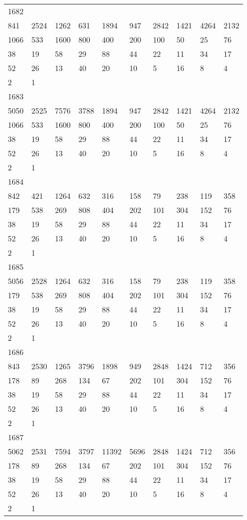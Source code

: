 \begin{longtable}{*{10}{l}}
1682&&&&&&&&&\\
841& 2524& 1262& 631& 1894& 947& 2842& 1421& 4264& 2132\\
1066& 533& 1600& 800& 400& 200& 100& 50& 25& 76\\
38& 19& 58& 29& 88& 44& 22& 11& 34& 17\\
52& 26& 13& 40& 20& 10& 5& 16& 8& 4\\
2& 1& \\

1683&&&&&&&&&\\
5050& 2525& 7576& 3788& 1894& 947& 2842& 1421& 4264& 2132\\
1066& 533& 1600& 800& 400& 200& 100& 50& 25& 76\\
38& 19& 58& 29& 88& 44& 22& 11& 34& 17\\
52& 26& 13& 40& 20& 10& 5& 16& 8& 4\\
2& 1& \\

1684&&&&&&&&&\\
842& 421& 1264& 632& 316& 158& 79& 238& 119& 358\\
179& 538& 269& 808& 404& 202& 101& 304& 152& 76\\
38& 19& 58& 29& 88& 44& 22& 11& 34& 17\\
52& 26& 13& 40& 20& 10& 5& 16& 8& 4\\
2& 1& \\

1685&&&&&&&&&\\
5056& 2528& 1264& 632& 316& 158& 79& 238& 119& 358\\
179& 538& 269& 808& 404& 202& 101& 304& 152& 76\\
38& 19& 58& 29& 88& 44& 22& 11& 34& 17\\
52& 26& 13& 40& 20& 10& 5& 16& 8& 4\\
2& 1& \\

1686&&&&&&&&&\\
843& 2530& 1265& 3796& 1898& 949& 2848& 1424& 712& 356\\
178& 89& 268& 134& 67& 202& 101& 304& 152& 76\\
38& 19& 58& 29& 88& 44& 22& 11& 34& 17\\
52& 26& 13& 40& 20& 10& 5& 16& 8& 4\\
2& 1& \\

1687&&&&&&&&&\\
5062& 2531& 7594& 3797& 11392& 5696& 2848& 1424& 712& 356\\
178& 89& 268& 134& 67& 202& 101& 304& 152& 76\\
38& 19& 58& 29& 88& 44& 22& 11& 34& 17\\
52& 26& 13& 40& 20& 10& 5& 16& 8& 4\\
2& 1& \\


\end{longtable}
